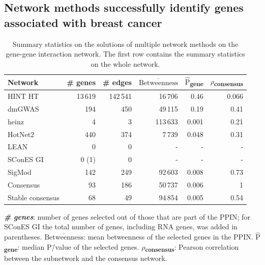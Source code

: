 \documentclass[draft,twocolumn, 11pt]{article}
\newcommand{\mean}[1]{$\overline{\mbox{#1}}$}
\newcommand{\median}[1]{$\hat{\mbox{#1}}$}
\begin{document}
\subsection{Network methods successfully identify genes associated with breast cancer}
\label{results:separate_networks}
\begin{table}[htbp]
  \centering
  \begin{threeparttable}
\caption{Summary statistics on the solutions of multiple network methods on the gene-gene interaction network. The first row contains the summary statistics on the whole network.}
\label{tab:gene_solutions}
\centering
\begin{tabular}{lrrrrr}
Network & \# genes & \# edges & \mean{Betweenness} & \median{P}\textsubscript{gene} & \(\rho\)\textsubscript{consensus}\\
\hline
HINT HT & 13\,619 & 142\,541 & 16\,706 & 0.46 & 0.066\\
\hline
dmGWAS & 194 & 450 & 49\,115 & 0.19 & 0.41\\
heinz & 4 & 3 & 113\,633 & 0.001 & 0.21\\
HotNet2 & 440 & 374 & 7\,739 & 0.048 & 0.31\\
LEAN & 0 & 0 & - & - & -\\
SConES GI & 0 (1) & 0 & - & - & -\\
SigMod & 142 & 249 & 92\,603 & 0.008 & 0.73\\
\hline
Consensus & 93 & 186 & 50\,737 & 0.006 & 1\\
Stable consensus & 68 & 49 & 94\,854 & 0.005 & 0.54 \\
\end{tabular}
\begin{tablenotes}
  \footnotesize{
    \item \textbf{\emph{\# genes}}: number of genes selected out of those that are part of the PPIN; for SConES GI the total number of genes, including RNA genes, was added in parentheses. \textbf{\mean{Betweenness}}: mean betweenness of the selected genes in the PPIN. \textbf{\median{P}\textsubscript{gene}}: median P\=/value of the selected genes. \textbf{\(\rho\)\textsubscript{consensus}}: Pearson correlation between the subnetwork and the consensus network.
  }
\end{tablenotes}
\end{threeparttable}
\end{table}
\end{document}
